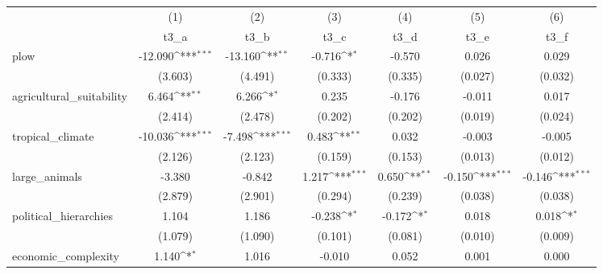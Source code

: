 {
\def\sym#1{\ifmmode^{#1}\else\(^{#1}\)\fi}
\begin{tabular}{l*{6}{c}}
\hline\hline
            &\multicolumn{1}{c}{(1)}&\multicolumn{1}{c}{(2)}&\multicolumn{1}{c}{(3)}&\multicolumn{1}{c}{(4)}&\multicolumn{1}{c}{(5)}&\multicolumn{1}{c}{(6)}\\
            &\multicolumn{1}{c}{t3\_a}&\multicolumn{1}{c}{t3\_b}&\multicolumn{1}{c}{t3\_c}&\multicolumn{1}{c}{t3\_d}&\multicolumn{1}{c}{t3\_e}&\multicolumn{1}{c}{t3\_f}\\
\hline
plow        &     -12.090\sym{***}&     -13.160\sym{**} &      -0.716\sym{*}  &      -0.570         &       0.026         &       0.029         \\
            &     (3.603)         &     (4.491)         &     (0.333)         &     (0.335)         &     (0.027)         &     (0.032)         \\
[1em]
agricultural\_suitability&       6.464\sym{**} &       6.266\sym{*}  &       0.235         &      -0.176         &      -0.011         &       0.017         \\
            &     (2.414)         &     (2.478)         &     (0.202)         &     (0.202)         &     (0.019)         &     (0.024)         \\
[1em]
tropical\_climate&     -10.036\sym{***}&      -7.498\sym{***}&       0.483\sym{**} &       0.032         &      -0.003         &      -0.005         \\
            &     (2.126)         &     (2.123)         &     (0.159)         &     (0.153)         &     (0.013)         &     (0.012)         \\
[1em]
large\_animals&      -3.380         &      -0.842         &       1.217\sym{***}&       0.650\sym{**} &      -0.150\sym{***}&      -0.146\sym{***}\\
            &     (2.879)         &     (2.901)         &     (0.294)         &     (0.239)         &     (0.038)         &     (0.038)         \\
[1em]
political\_hierarchies&       1.104         &       1.186         &      -0.238\sym{*}  &      -0.172\sym{*}  &       0.018         &       0.018\sym{*}  \\
            &     (1.079)         &     (1.090)         &     (0.101)         &     (0.081)         &     (0.010)         &     (0.009)         \\
[1em]
economic\_complexity&       1.140\sym{*}  &       1.016         &      -0.010         &       0.052         &       0.001         &       0.000         \\

\end{tabular}}
